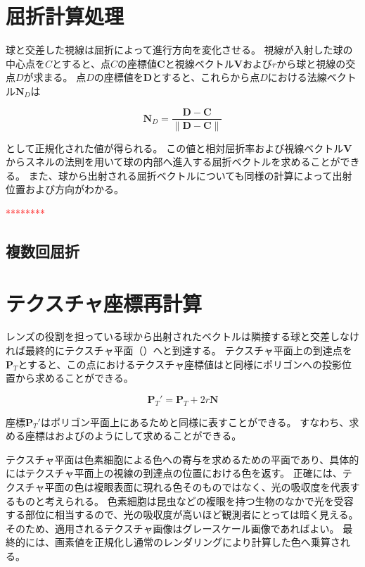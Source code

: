 \section{屈折計算処理}
\label{SRefraction}

球と交差した視線は屈折によって進行方向を変化させる。
視線が入射した球の中心点を$C$とすると、点$C$の座標値$\bm{C}$と視線ベクトル$\bm{V}$および$r$から球と視線の交点$D$が求まる\figref{}。
点$D$の座標値を$\bm{D}$とすると、これらから点$D$における法線ベクトル$\bm{N}_D$は

\begin{equation}
\label{ENd}
\bm{N}_D = \frac{\bm{D} - \bm{C}}{\|\bm{D} - \bm{C}\|}
\end{equation}

\noindent
として正規化された値が得られる。
この値と相対屈折率および視線ベクトル$\bm{V}$からスネルの法則を用いて球の内部へ進入する屈折ベクトルを求めることができる。
また、球から出射される屈折ベクトルについても同様の計算によって出射位置および方向がわかる。

\textcolor{red}{********}
\subsection{複数回屈折}
\label{SSMultiRefraction}


\section{テクスチャ座標再計算}
\label{STexturerecalculation}

レンズの役割を担っている球から出射されたベクトルは隣接する球と交差しなければ最終的にテクスチャ平面（）へと到達する。
テクスチャ平面上の到達点を$\bm{P}_T$とすると、この点におけるテクスチャ座標値はと同様にポリゴンへの投影位置から求めることができる。

\begin{equation}
\label{EPtdash}
\bm{P}_T' = \bm{P}_T + 2r\bm{N}
\end{equation}

\noindent
座標$\bm{P}_T'$はポリゴン平面上にあるためと同様に表すことができる。
すなわち、求める座標はおよびのようにして求めることができる。


テクスチャ平面は色素細胞による色への寄与を求めるための平面であり、具体的にはテクスチャ平面上の視線の到達点の位置における色を返す。
正確には、テクスチャ平面の色は複眼表面に現れる色そのものではなく、光の吸収度を代表するものと考えられる。
色素細胞は昆虫などの複眼を持つ生物のなかで光を受容する部位に相当するので、光の吸収度が高いほど観測者にとっては暗く見える。
そのため、適用されるテクスチャ画像はグレースケール画像であればよい。
最終的には、画素値を正規化し通常のレンダリングにより計算した色へ乗算される。



